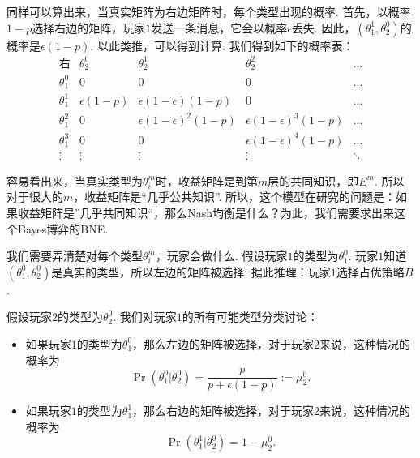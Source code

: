 同样可以算出来，当真实矩阵为右边矩阵时，每个类型出现的概率. 首先，以概率$1 - p$选择右边的矩阵，玩家$1$发送一条消息，它会以概率$\epsilon$丢失. 因此，$(\theta_1^1,\theta_2^0)$的概率是$\epsilon(1 - p)$. 以此类推，可以得到计算. 我们得到如下的概率表：
\[
\begin{array}{c|cccc}
\text{右} & \theta_2^0 & \theta_2^1 & \theta_2^2 & \dots \\
\hline
\theta_1^0 & 0 & 0 & 0 & \dots \\
\theta_1^1 & \epsilon(1 - p) & \epsilon(1 - \epsilon)(1 - p) & 0 & \dots \\
\theta_1^2 & 0 & \epsilon(1 - \epsilon)^2(1 - p) & \epsilon(1 - \epsilon)^3(1 - p) & \dots \\
\theta_1^3 & 0 & 0 & \epsilon(1 - \epsilon)^4(1 - p) & \dots \\
\vdots & \vdots & \vdots & \vdots & \ddots
\end{array}
\]


容易看出来，当真实类型为$\theta_i^m$时，收益矩阵是到第$m$层的共同知识，即$E^m$. 所以对于很大的$m$，收益矩阵是“几乎公共知识”. 所以，这个模型在研究的问题是：如果收益矩阵是”几乎共同知识“，那么Nash均衡是什么？为此，我们需要求出来这个Bayes博弈的BNE.

我们需要弄清楚对每个类型$\theta_i^m$，玩家会做什么. 假设玩家$1$的类型为$\theta_1^0$. 玩家$1$知道$(\theta_1^0,\theta_2^0)$是真实的类型，所以左边的矩阵被选择. 据此推理：玩家$1$选择占优策略$B$.

假设玩家$2$的类型为$\theta_2^0$. 我们对玩家$1$的所有可能类型分类讨论：
\begin{itemize}
    \item 如果玩家$1$的类型为$\theta_1^0$，那么左边的矩阵被选择，对于玩家$2$来说，这种情况的概率为
    \[\Pr(\theta_1^0|\theta_2^0) = \frac{p}{p+\epsilon(1-p)} := \mu_2^0.\] 
    \item 如果玩家$1$的类型为$\theta_1^1$，那么右边的矩阵被选择，对于玩家$2$来说，这种情况的概率为
    \[\Pr(\theta_1^1|\theta_2^0) = 1 - \mu_2^0.\]
\end{itemize}

